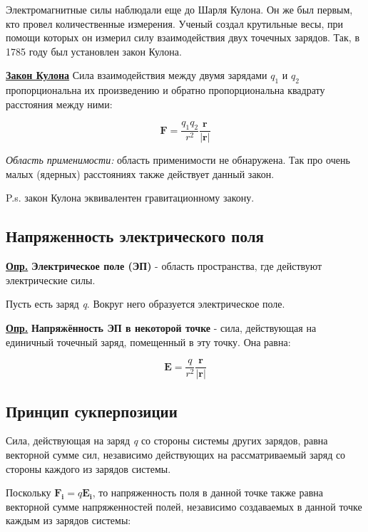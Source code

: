 Электромагнитные силы наблюдали еще до Шарля Кулона. Он же был первым, кто провел количественные измерения. Ученый создал крутильные весы, при помощи которых он измерил силу взаимодействия двух точечных зарядов. Так, в 1785 году был установлен закон Кулона.

\colorbox{faded}{\underline{\textbf{Закон Кулона}}} Сила взаимодействия между двумя зарядами $q_{1}$ и $q_{2}$ пропорциональна их произведению и обратно пропорциональна квадрату расстояния между ними: 

\begin{equation}\label{opr1}
\mathbf{F} = \frac{q_{1} q_{2}}{r^2} \frac{\mathbf{r}}{|\mathbf{r}|}
\end{equation}

\textit{Область применимости:} область применимости не обнаружена. Так про очень малых (ядерных) расстояниях также действует данный закон.

P.s. закон Кулона эквивалентен гравитационному закону.

\subsection{Напряженность электрического поля}

\colorbox{faded}{\underline{\textbf{Опр.}}} \textbf{Электрическое поле (ЭП)} - область пространства, где действуют электрические силы.

Пусть есть заряд \textit{q}. Вокруг него образуется электрическое поле. 

\colorbox{faded}{\underline{\textbf{Опр.}}} \textbf{Напряжённость ЭП в некоторой точке} - сила, действующая на единичный точечный заряд, помещенный в эту точку. Она равна:

\begin{equation}\label{opr2}
\mathbf{E} = \frac{q}{r^2} \frac{\mathbf{r}}{|\mathbf{r}|}
\end{equation}

\subsection{Принцип сукперпозиции}

Сила, действующая на заряд \textit{q} со стороны системы других зарядов, равна векторной сумме сил, независимо действующих на рассматриваемый заряд со стороны каждого из зарядов системы.

Поскольку $\mathbf{F_{i}} = q \mathbf{E_{i}}$, то напряженность поля в данной точке также равна векторной сумме напряженностей полей, независимо создаваемых в данной точке каждым из зарядов системы:

